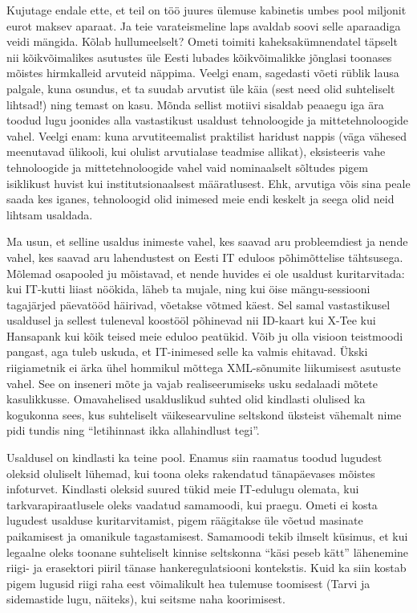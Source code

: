 Kujutage endale ette, et teil on töö juures ülemuse kabinetis umbes pool miljonit eurot maksev aparaat. Ja teie varateismeline laps avaldab soovi selle aparaadiga veidi mängida. Kõlab hullumeelselt? Ometi toimiti kaheksakümnendatel täpselt nii kõikvõimalikes asutustes üle Eesti lubades kõikvõimalikke jõnglasi toonases mõistes hirmkalleid arvuteid näppima. Veelgi enam, sagedasti võeti rüblik lausa palgale, kuna osundus, et ta suudab arvutist üle käia (sest need olid suhteliselt lihtsad!) ning temast on kasu. Mõnda sellist motiivi sisaldab peaaegu iga ära toodud lugu joonides alla vastastikust usaldust tehnoloogide ja mittetehnoloogide vahel. Veelgi enam: kuna arvutiteemalist praktilist haridust nappis (väga vähesed meenutavad ülikooli, kui olulist arvutialase teadmise allikat), eksisteeris vahe  tehnoloogide ja mittetehnoloogide vahel vaid nominaalselt sõltudes pigem isiklikust huvist kui  institutsionaalsest määratlusest. Ehk, arvutiga võis sina peale saada kes iganes, tehnoloogid olid inimesed meie endi keskelt ja seega olid neid lihtsam usaldada.

Ma usun, et selline usaldus inimeste vahel, kes saavad aru probleemdiest ja nende vahel, kes saavad aru lahendustest on Eesti IT eduloos põhimõttelise tähtsusega. Mõlemad osapooled ju mõistavad, et nende huvides ei ole usaldust kuritarvitada: kui IT-kutti liiast nöökida, läheb ta mujale, ning kui öise mängu-sessiooni tagajärjed päevatööd häirivad, võetakse võtmed käest. Sel samal vastastikusel usaldusel ja sellest tuleneval koostööl põhinevad nii ID-kaart kui X-Tee kui Hansapank kui kõik teised meie eduloo peatükid. Võib ju olla visioon teistmoodi pangast, aga tuleb uskuda, et IT-inimesed selle ka valmis ehitavad. Ükski riigiametnik ei ärka ühel hommikul mõttega XML-sõnumite liikumisest asutuste vahel. See on inseneri mõte ja vajab realiseerumiseks usku sedalaadi mõtete kasulikkusse. Omavahelised usalduslikud suhted olid kindlasti olulised ka kogukonna sees, kus suhteliselt väikesearvuline seltskond üksteist vähemalt nime pidi tundis ning \enquote{letihinnast ikka allahindlust tegi}. 

Usaldusel on kindlasti ka teine pool. Enamus siin raamatus toodud lugudest oleksid oluliselt lühemad, kui toona oleks rakendatud tänapäevases mõistes infoturvet. Kindlasti oleksid suured tükid meie IT-edulugu olemata, kui tarkvarapiraatlusele oleks vaadatud samamoodi, kui praegu. Ometi ei kosta lugudest usalduse kuritarvitamist, pigem räägitakse üle võetud masinate paikamisest ja omanikule tagastamisest. Samamoodi tekib ilmselt küsimus, et kui legaalne oleks toonane suhteliselt kinnise seltskonna \enquote{käsi peseb kätt} lähenemine riigi- ja erasektori piiril tänase hankeregulatsiooni kontekstis. Kuid ka siin kostab pigem lugusid riigi raha eest võimalikult hea tulemuse toomisest (Tarvi ja sidemastide lugu, näiteks), kui seitsme naha koorimisest. 

